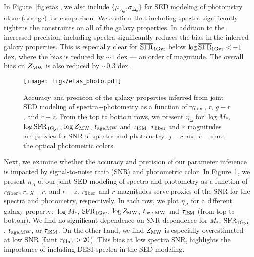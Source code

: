 In Figure~\ref{fig:etas}, we also include $\{\mu_{\Delta_{\theta}},
\sigma_{\Delta_{\theta}}\}$ for SED modeling of photometry alone (orange) for
comparison. 
We confirm that including spectra significantly tightens the constraints on all
of the galaxy properties. 
In addition to the increased precision, including spectra significantly
reduces the bias in the inferred galaxy properties. 
This is especially clear for $\overline{\rm SFR}_{\rm 1Gyr}$ below $\log\overline{\rm SFR}_{\rm 1Gyr} < -1$ dex, where the
bias is reduced by ${\sim}1$ dex --- an order of magnitude. 
The overall bias on $Z_{\rm MW}$ is also reduced by $\sim0.3$ dex. 

\begin{figure}
\begin{center}
    \texttt{[image: figs/etas\_photo.pdf]}
    \caption{
        Accuracy and precision of the galaxy properties inferred from joint SED
        modeling of spectra+photometry as a function of $r_{\rm fiber}$, $r$,
        $g-r$, and $r-z$.
        From the top to bottom rows, we present $\eta_\Delta$ for $\log M_*$,
        $\log\overline{\rm SFR}_{\rm 1Gyr}$, $\log Z_{\rm MW}$, $t_{\rm age, MW}$ and $\tau_{\rm ISM}$.
        $r_{\rm fiber}$ and $r$ magnitudes are proxies for SNR of spectra and
        photometry. 
        $g-r$ and $r-z$ are the optical photometric colors. 
    } 
    \label{fig:eta_photo}
\end{center}
\end{figure}


Next, we examine whether the accuracy and precision of our parameter inference
is impacted by signal-to-noise ratio (SNR) and photometric color. 
In Figure~\ref{fig:eta_photo}, we present $\eta_\Delta$ of our joint
SED modeling of spectra and photometry as a function of $r_{\rm fiber}$, $r$,
$g-r$, and $r-z$. 
$r_{\rm fiber}$ and $r$ magnitudes serve proxies of the SNR for the spectra and
photometry, respectively. 
In each row, we plot $\eta_\Delta$ for a different galaxy property: $\log M_*$,
$\overline{\rm SFR}_{\rm 1Gyr}$, $\log Z_{\rm MW}$, $t_{\rm age, MW}$ and $\tau_{\rm ISM}$ (from top to bottom).
We find no significant dependence on SNR dependence for $M_*$, $\overline{\rm SFR}_{\rm 1Gyr}$,
$t_{\rm age, MW}$, or $\tau_{\rm ISM}$. 
On the other hand, we find $Z_{\rm MW}$ is especially overestimated at low SNR
(faint $r_{\rm fiber} > 20$).  
This bias at low spectra SNR, highlights the importance of including DESI
spectra in the SED modeling. 



